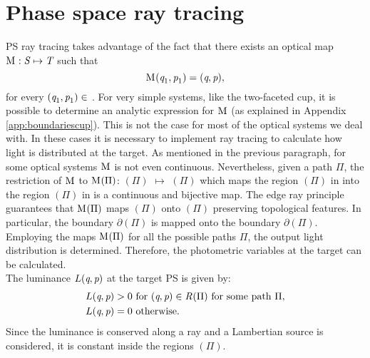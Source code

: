 \section{Phase space ray tracing}\label{sec:PS_raytracing}
PS ray tracing takes advantage of the fact that there exists an optical map
$
\mathrm{M}_{\textit{}}: \mbox{$\emph{S}_{\textit{}}$} \mapsto \mbox{$\emph{T}_{\textit{}}$}
$
 such that
\begin{equation}\label{eq:map1}
\mathrm{M}_{\textit{}}(\textit{q}_1,\textit{p}_1)=(\textit{q},\textit{p}),
\end{equation} for every $(\textit{q}_1,\textit{p}_1)\in$ .
For very simple systems, like the two-faceted cup, it is possible to determine an analytic expression for $\mathrm{M}_{\textit{}}$ (as explained in Appendix \ref{app:boundariescup}).
This is not the case for most of the optical systems we deal with. In these cases it is necessary to implement ray tracing to calculate how light is distributed at the target.
As mentioned in the previous paragraph, for some optical systems $\mathrm{M}_{\textit{}}$ is not even continuous.
Nevertheless, given a path $\Pi$, the restriction of $\mathrm{M}_{\textit{}}$ to  $\mathrm{M}_{\textit{}}(\Pi)$: $(\Pi)$ $\mapsto$ $(\Pi)$
which maps the region $(\Pi)$ in  into the region $(\Pi)$ in  is a continuous and bijective map. 
The edge ray principle guarantees that $\mathrm{M}_{\textit{}}(\Pi)$ maps $(\Pi)$ onto $(\Pi)$ preserving topological features. In particular, the boundary $\partial$$(\Pi)$ is mapped onto the boundary $\partial$$(\Pi)$. %
Employing the maps $\mathrm{M}_{\textit{}}(\Pi)$ for all the possible paths $\Pi$, the output light distribution is determined. Therefore, the photometric variables at the target can be calculated.
\\ \indent The luminance $L(\textit{q}, \textit{p})$ at the target PS is given by:
\begin{equation}
\begin{aligned}
\label{eq:PSluminance}
L(\variabile{q}, \variabile{p}) &> 0  \mbox{  for } (\variabile{q}, \variabile{p})\in \mbox{\set{R}{}{}}(\Pi) \mbox{ for some path } \Pi,\\ \vspace{0.5 cm}
L(\variabile{q}, \variabile{p}) &= 0  \mbox{  otherwise}.
\end{aligned}
\end{equation}
Since the luminance is conserved along a ray and a Lambertian source is considered, it is constant inside the regions $(\Pi)$.
